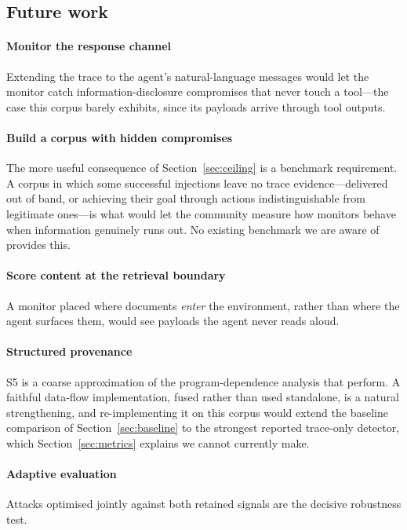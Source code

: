 \documentclass[preprint,12pt,number]{elsarticle}
\theoremstyle{definition}
\begin{document}
\subsection{Future work}

\paragraph{Monitor the response channel} Extending the trace to the agent's
natural-language messages would let the monitor catch information-disclosure
compromises that never touch a tool---the case this corpus barely exhibits, since
its payloads arrive through tool outputs.

\paragraph{Build a corpus with hidden compromises} The more useful consequence of
Section~\ref{sec:ceiling} is a benchmark requirement. A corpus in which some
successful injections leave no trace evidence---delivered out of band, or achieving
their goal through actions indistinguishable from legitimate ones---is what would
let the community measure how monitors behave when information genuinely runs out.
No existing benchmark we are aware of provides this.

\paragraph{Score content at the retrieval boundary} A monitor placed where
documents \emph{enter} the environment, rather than where the agent surfaces them,
would see payloads the agent never reads aloud.

\paragraph{Structured provenance} S5 is a coarse approximation of the
program-dependence analysis that \citet{wang2025agentarmor} perform. A faithful
data-flow implementation, fused rather than used standalone, is a natural
strengthening, and re-implementing it on this corpus would extend the baseline
comparison of Section~\ref{sec:baseline} to the strongest reported trace-only
detector, which Section~\ref{sec:metrics} explains we cannot currently make.

\paragraph{Adaptive evaluation} Attacks optimised jointly against both
retained signals are the decisive robustness test.
\end{document}
